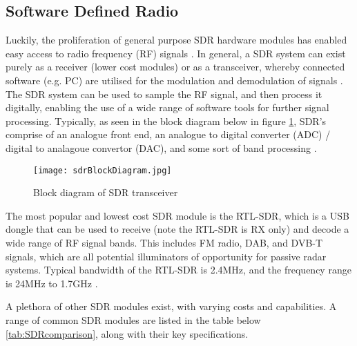 \subsection{Software Defined Radio \label{sec: SDRdongle}}
Luckily, the proliferation of general purpose SDR hardware modules has enabled easy access to radio frequency (RF) signals \cite{SDRtheory}. In general, a SDR system can exist purely as a receiver (lower cost modules) or as a transceiver, whereby connected software (e.g. PC) are utilised for the modulation and demodulation of signals \cite{SDRgeneralInfo}. The SDR system can be used to sample the RF signal, and then process it digitally, enabling the use of a wide range of software tools for further signal processing. Typically, as seen in the block diagram below in figure \ref{fig:SDRblock}, SDR's comprise of an analogue front end, an analogue to digital converter (ADC) / digital to analagoue convertor (DAC), and some sort of band processing \cite{SDRgeneralInfo}.

\begin{figure}[htbp]
    \centering
    \texttt{[image: sdrBlockDiagram.jpg]}
    \caption{Block diagram of SDR transceiver \cite{SDRgeneralInfo}}
    \label{fig:SDRblock}
\end{figure}


\par \vspace{0.5cm}
The most popular and lowest cost SDR module is the RTL-SDR, which is a USB dongle that can be used to receive (note the RTL-SDR is RX only) and decode a wide range of RF signal bands. This includes FM radio, DAB, and DVB-T signals, which are all potential illuminators of opportunity for passive radar systems. Typical bandwidth of the RTL-SDR is 2.4MHz, and the frequency range is 24MHz to 1.7GHz \cite{SDRdongle}.

A plethora of other SDR modules exist, with varying costs and capabilities. A range of common SDR modules are listed in the table below \ref{tab:SDRcomparison}, along with their key specifications. 


